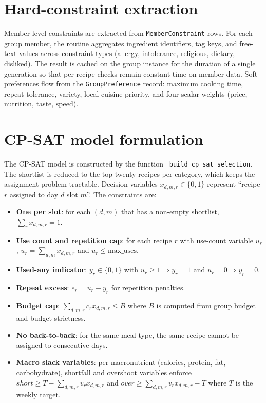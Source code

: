 \section{Hard-constraint extraction}

Member-level constraints are extracted from \texttt{MemberConstraint} rows. For each group member, the routine aggregates ingredient identifiers, tag keys, and free-text values across constraint types (allergy, intolerance, religious, dietary, disliked). The result is cached on the group instance for the duration of a single generation so that per-recipe checks remain constant-time on member data. Soft preferences flow from the \texttt{GroupPreference} record: maximum cooking time, repeat tolerance, variety, local-cuisine priority, and four scalar weights (price, nutrition, taste, speed).

\section{CP-SAT model formulation}

The CP-SAT model is constructed by the function \texttt{\_build\_cp\_sat\_selection}. The shortlist is reduced to the top twenty recipes per category, which keeps the assignment problem tractable. Decision variables $x_{d,m,r} \in \{0,1\}$ represent ``recipe $r$ assigned to day $d$ slot $m$''. The constraints are:

\begin{itemize}
\item \textbf{One per slot}: for each $(d, m)$ that has a non-empty shortlist, $\sum_{r} x_{d,m,r} = 1$.
\item \textbf{Use count and repetition cap}: for each recipe $r$ with use-count variable $u_r$, $u_r = \sum_{d,m} x_{d,m,r}$ and $u_r \le \mathrm{max\_uses}$.
\item \textbf{Used-any indicator}: $y_r \in \{0,1\}$ with $u_r \ge 1 \Rightarrow y_r = 1$ and $u_r = 0 \Rightarrow y_r = 0$.
\item \textbf{Repeat excess}: $e_r = u_r - y_r$ for repetition penalties.
\item \textbf{Budget cap}: $\sum_{d,m,r} c_r x_{d,m,r} \le B$ where $B$ is computed from group budget and budget strictness.
\item \textbf{No back-to-back}: for the same meal type, the same recipe cannot be assigned to consecutive days.
\item \textbf{Macro slack variables}: per macronutrient (calories, protein, fat, carbohydrate), shortfall and overshoot variables enforce $\mathit{short} \ge T - \sum_{d,m,r} v_r x_{d,m,r}$ and $\mathit{over} \ge \sum_{d,m,r} v_r x_{d,m,r} - T$ where $T$ is the weekly target.
\end{itemize}


